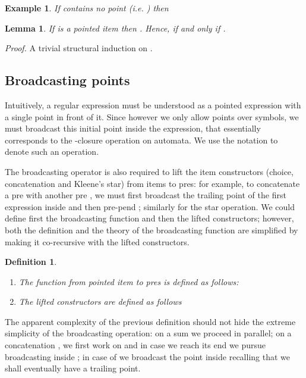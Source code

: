 \documentclass[preprint]{sigplanconf}
\newcounter{item}
\newtheorem{lemma}[item]{Lemma}
\newtheorem{definition}[item]{Definition}
\newtheorem{example}[item]{Example}
\newenvironment{proof}{\begin{trivlist}\item[]{\em Proof.}}{\end{trivlist}}
\begin{document}
\begin{example}
If  contains no point (i.e. ) then 
\end{example}

\begin{lemma}
\label{lemma:epsilon}
If  is a pointed item then . 
Hence,  if and only if 
.
\end{lemma}
\begin{proof}
A trivial structural induction on .
\end{proof}

\subsection{Broadcasting points}
Intuitively, a regular expression  must be understood as a pointed
expression with a single point in front of it. Since however we only
allow points over symbols, we must broadcast this initial point
inside the expression, 
that essentially corresponds to the -closure operation on
automata. We use the notation  to denote such an operation.

The broadcasting operator is also required to lift the item constructors 
(choice, concatenation and Kleene's star) from items to pres: for example,
to concatenate a pre  
with another pre , we must first
broadcast the trailing point of the first expression inside  and then
pre-pend ; similarly for the star operation.
We could define first the broadcasting
function  and then the lifted constructors; however, 
both the definition and the theory of the 
broadcasting function are simplified by making it
co-recursive with the lifted constructors.

\begin{definition}\ \label{def:bullet}
\begin{enumerate}
\item The function  from pointed item to pres is defined as
follows:

\item The lifted constructors are defined as follows

\end{enumerate}
\end{definition}

\noindent 
The apparent complexity of the previous definition should not 
hide the extreme simplicity of the broadcasting operation: on a sum we
proceed in parallel; on a concatenation , we first work on
 and in case we reach its end we pursue broadcasting inside
; in case of  we broadcast the point inside  recalling
that we shall eventually have a trailing point. 
\end{document}
